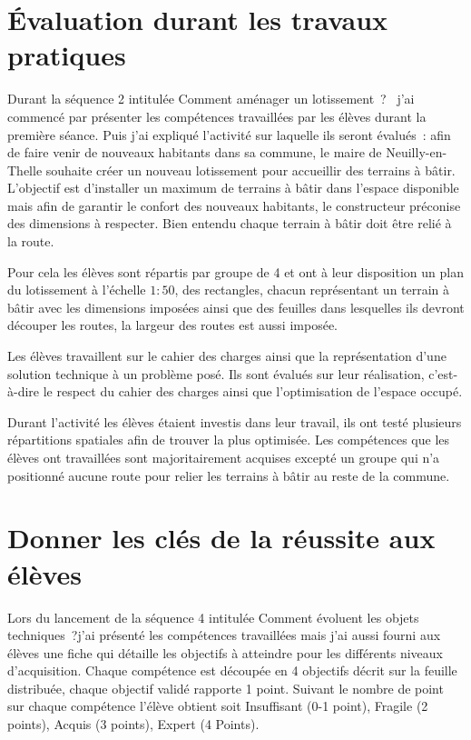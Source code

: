 

\section{Évaluation durant les travaux pratiques}

Durant la séquence 2 intitulée \og Comment aménager un lotissement~? \fg \ j'ai commencé par présenter les compétences travaillées par les élèves durant la première séance.
Puis j'ai expliqué l'activité sur laquelle ils seront évalués~: afin de faire venir de nouveaux habitants dans sa commune, le maire de Neuilly-en-Thelle souhaite créer un nouveau lotissement pour accueillir des terrains à bâtir.
L'objectif est d'installer un maximum de terrains à bâtir dans l'espace disponible mais afin de garantir le confort des nouveaux habitants, le constructeur préconise des dimensions à respecter.
Bien entendu chaque terrain à bâtir doit être relié à la route.

Pour cela les élèves sont répartis par groupe de 4 et ont à leur disposition un plan du lotissement à l'échelle $1:50$, des rectangles, chacun représentant un terrain à bâtir avec les dimensions imposées ainsi que des feuilles dans lesquelles ils devront découper les routes, la largeur des routes est aussi imposée.

Les élèves travaillent sur le cahier des charges ainsi que la représentation d'une solution technique à un problème posé.
Ils sont évalués sur leur réalisation, c'est-à-dire le respect du cahier des charges ainsi que l'optimisation de l'espace occupé.

Durant l'activité les élèves étaient investis dans leur travail, ils ont testé plusieurs répartitions spatiales afin de trouver la plus optimisée.
Les compétences que les élèves ont travaillées sont majoritairement acquises excepté un groupe qui n'a positionné aucune route pour relier les terrains à bâtir au reste de la commune.



\section{Donner les clés de la réussite aux élèves}

Lors du lancement de la séquence 4 intitulée \og Comment évoluent les objets techniques~?\fg j'ai présenté les compétences travaillées mais j'ai aussi fourni aux élèves une fiche qui détaille les objectifs à atteindre pour les différents niveaux d'acquisition. 
Chaque compétence est découpée en 4 objectifs décrit sur la feuille distribuée, chaque objectif validé rapporte 1 point. Suivant le nombre de point sur chaque compétence l'élève obtient soit Insuffisant (0-1 point), Fragile (2 points), Acquis (3 points), Expert (4 Points).

